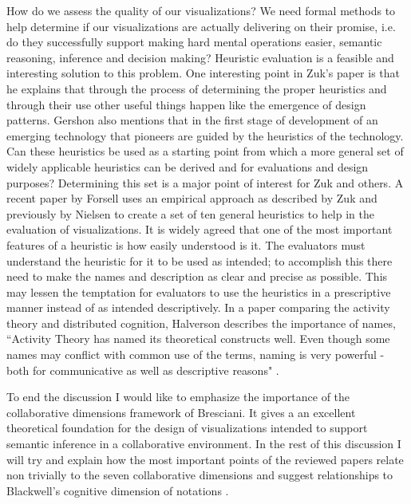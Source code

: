 \documentclass{sig-alternate}
\begin{document}
How do we assess the quality of our visualizations? We need
formal methods to help determine if our visualizations are actually delivering on
their promise, i.e. do they successfully support making hard mental operations
easier, semantic reasoning, inference and decision making? Heuristic evaluation
is a feasible and interesting solution to this problem. One interesting point in Zuk's paper is that he explains that through the process of determining the
proper heuristics and through their use other useful things happen like the
emergence of design patterns. Gershon \cite{Gershon:1998:Informationvisualization} also mentions that in the first
stage of development of an emerging technology that pioneers are guided by the
heuristics of the technology. Can these heuristics be used as a starting point
from which a more general set of widely applicable heuristics can be derived and
for evaluations and design purposes? Determining this set is a major point of
interest for Zuk and others. A recent paper by Forsell \cite{Forsell:2010:AnHeuristicSetForEvaluationInInformationVisualization} uses an
empirical approach as described by Zuk and previously by Nielsen \cite{Nielsen:1994:HeuristicEvaluation}
to create a set of ten general heuristics to help in the evaluation of
visualizations. It is widely agreed that one of the most important features of a
heuristic is how easily understood is it. The evaluators must understand the
heuristic for it to be used as intended; to accomplish this there need to make
the names and description as clear and precise as possible. This may lessen the
temptation for evaluators to use the heuristics in a prescriptive manner instead
of as intended descriptively. In a paper comparing the activity theory and
distributed cognition, Halverson describes the importance of names, ``Activity
Theory has named its theoretical constructs well. Even though some names may
conflict with common use of the terms, naming is very powerful - both for
communicative as well as descriptive reasons" \cite{Halverson:2002:ActivityTheory}.



To end the
discussion I would like to emphasize the importance of the collaborative
dimensions framework of Bresciani. It gives a an excellent theoretical
foundation for the design of visualizations intended to support semantic
inference in a collaborative environment. In the rest of this discussion I will
try and explain how the most important points of the reviewed papers relate non
trivially to the seven collaborative dimensions
\cite{Bresciani:ACollaborativeDimensionsFramework} and suggest relationships to
Blackwell's cognitive dimension of notations \cite{Blackwell:NotationalSystems}.
\end{document}
